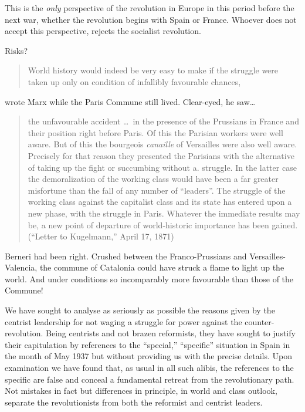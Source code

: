 This is the \emph{only} perspective of the revolution in Europe in this period before the next war, whether the revolution begins with Spain or France. Whoever does not accept this perspective, rejects the socialist revolution.

Risks?

\begin{quotation}
  World history would indeed be very easy to make if the struggle were taken up only on condition of infallibly favourable chances,  
\end{quotation}
wrote Marx while the Paris Commune still lived.
Clear-eyed, he saw\dots
\nowidow

\begin{quotation}
  the unfavourable accident \dots\ in the presence of the Prussians in France and their position right before Paris. Of this the Parisian workers were well aware. But of this the bourgeois \emph{canaille} of Versailles were also well aware. Precisely for that reason they presented the Parisians with the alternative of taking up the fight or succumbing without a. struggle. In the latter case the demoralization of the working class would have been a far greater misfortune than the fall of any number of “leaders”. The struggle of the working class against the capitalist class and its state has entered upon a new phase, with the struggle in Paris. Whatever the immediate results may be, a new point of departure of world-historic importance has been gained. (``Letter to Kugelmann,'' April 17, 1871)
\end{quotation}

Berneri had been right. Crushed between the Franco-Prussians and Versailles-Valencia, the commune of Catalonia could have struck a flame to light up the world. And under conditions so incomparably more favourable than those of the Commune!

We have sought to analyse as seriously as possible the reasons given by the centrist leadership for not waging a struggle for power against the counter-revolution. Being centrists and not brazen reformists, they have sought to justify their capitulation by references to the ``special,'' ``specific'' situation in Spain in the month of May 1937 but without providing us with the precise details. Upon examination we have found that, as usual in all such alibis, the references to the specific are false and conceal a fundamental retreat from the revolutionary path. Not mistakes in fact but differences in principle, in world and class outlook, separate the revolutionists from both the reformist and centrist leaders.


